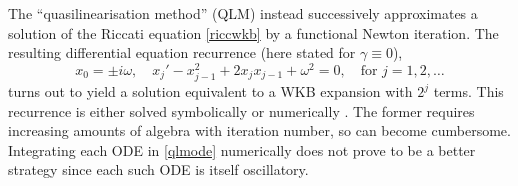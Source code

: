 \documentclass[10pt]{article}
\newcommand{\be}{\begin{equation}}
\newcommand{\ee}{\end{equation}}
\newcommand{\om}{\omega}
\begin{document}
The ``quasilinearisation method''
(QLM) \cite{bellman1970} instead successively approximates
a solution of the Riccati equation \cref{riccwkb}
by a functional Newton iteration.
The resulting differential equation recurrence (here stated for $\gamma\equiv 0$),
\be
x_0 = \pm i\om, \quad
x_j' - x_{j-1}^2 + 2x_j x_{j-1} + \om^2 = 0, \quad \text{for } j = 1, 2, \ldots
\label{qlmode}
\ee
turns out to yield a solution equivalent to a WKB expansion with $2^j$ terms.
This recurrence is either solved symbolically \cite{mandelzweig2004,krivec2006}
or numerically \cite{krivec2008,krivec2014}. The former
requires increasing amounts of algebra with iteration number, so can
become cumbersome. Integrating each ODE in \cref{qlmode} numerically does not prove to be a better strategy since each such ODE is itself oscillatory.
\end{document}
